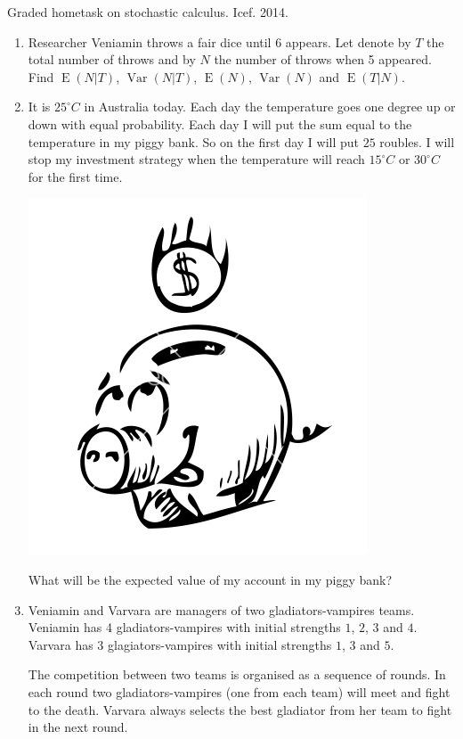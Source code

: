 \documentclass[12pt,a4paper]{article}
\DeclareMathOperator{\Var}{Var}
\DeclareMathOperator{\E}{E}
\begin{document}
\pagestyle{empty}
Graded hometask on stochastic calculus. Icef. 2014.


\begin{enumerate}

\item Researcher Veniamin throws a fair dice until 6 appears. Let denote by $T$ the total number of throws and by $N$ the number of throws when 5 appeared. Find $\E(N | T)$, $\Var(N | T)$, $\E(N)$, $\Var(N)$ and $\E(T|N)$.



\item It is $25^\circ C$ in Australia today. Each day the temperature goes one degree up or down with equal probability. Each day I will put the sum equal to the temperature in my piggy bank. So on the first day I will put $25$ roubles. I will stop my investment strategy when the temperature will reach $15^\circ C$ or $30^\circ C$ for the first time. 

\includegraphics[scale=0.25]{piggy.png} 

What will be the expected value of my account in my piggy bank?

\item Veniamin and Varvara are managers of two gladiators-vampires teams. Veniamin has 4 gladiators-vampires with initial strengths $1$, $2$, $3$ and $4$. Varvara has 3 glagiators-vampires with initial strengths $1$, $3$ and $5$. 

The competition between two teams is organised as a sequence of rounds. In each round two gladiators-vampires (one from each team) will meet and fight to the death. Varvara always selects the best gladiator from her team to fight in the next round. 


\end{enumerate}
\end{document}

